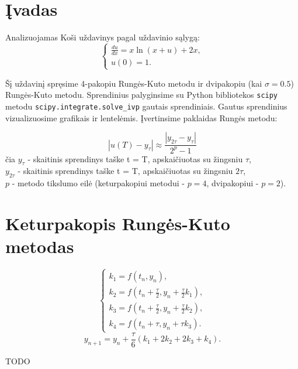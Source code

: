 \documentclass[]{VUMIFTemplateClass}
\begin{document}
\onehalfspacing


\tableofcontents
\onehalfspacing

\section{Įvadas}
Analizuojamas Koši uždavinys pagal uždavinio sąlygą:
\begin{equation}
    \begin{cases}
        \frac{du}{dx} = x \ln(x + u) + 2x,\\
        u(0) = 1.
    \end{cases}
\end{equation}

Šį uždavinį spręsime 4-pakopiu Rungės-Kuto metodu ir dvipakopiu (kai $\sigma = 0.5$) Rungės-Kuto metodu. Sprendinius palyginsime su Python bibliotekos \texttt{scipy} metodu \texttt{scipy.integrate.solve\_ivp} gautais sprendiniais. Gautus sprendinius vizualizuosime grafikais ir lentelėmis. Įvertinsime paklaidas Rungės metodu:

\[ |u(T) - y_{\tau}| \approx \frac{|y_{2 \tau} - y_{\tau}|}{2^p - 1} \]
čia $y_{\tau}$ - skaitinis sprendinys taške t = T, apskaičiuotas su žingsniu $\tau$,\\
$y_{2 \tau}$ - skaitinis sprendinys taške t = T, apskaičiuotas su žingsniu $2 \tau$,\\
$p$ - metodo tikslumo eilė (keturpakopiui metodui - $p = 4$, dvipakopiui - $p = 2$).

\section{Keturpakopis Rungės-Kuto metodas}
\begin{equation}
    \begin{cases}
        k_1 = f(t_n, y_n),\\
        k_2 = f(t_n + \frac{\tau}{2}, y_n + \frac{\tau}{2} k_1),\\
        k_3 = f(t_n + \frac{\tau}{2}, y_n + \frac{\tau}{2} k_2),\\
        k_4 = f(t_n + \tau, y_n + \tau k_3).
    \end{cases}
\end{equation}
\[ y_{n+1} = y_n + \frac{\tau}{6}(k_1 + 2k_2 + 2k_3 + k_4). \]

\begin{table}[H]
    \begin{center}
        
    \end{center}
    \caption{TODO}
\end{table}
\end{document}
